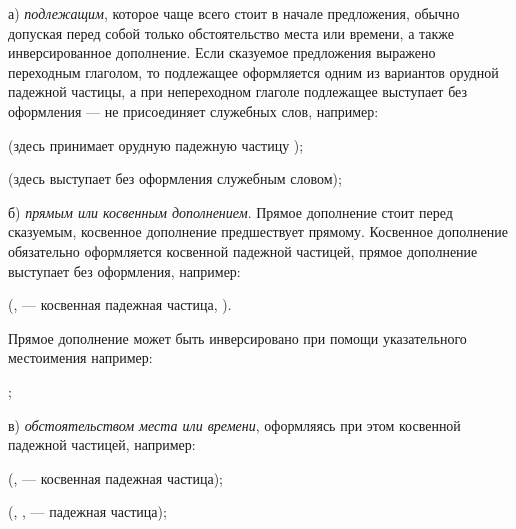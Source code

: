 а) \emph{подлежащим}, которое чаще всего стоит в начале предложения, обычно допуская перед собой только обстоятельство места или времени, а также инверсированное дополнение. Если сказуемое предложения выражено переходным глаголом, то подлежащее оформляется одним из вариантов орудной падежной частицы, а при непереходном глаголе подлежащее выступает без оформления --- не присоединяет служебных слов, например:
\begin{prfsample}
    \item {} (здесь  принимает орудную падежную частицу );
    \item {} (здесь  выступает без оформления служебным словом);
\end{prfsample}

б) \emph{прямым или косвенным дополнением}. Прямое дополнение стоит перед сказуемым, косвенное дополнение предшествует прямому. Косвенное дополнение обязательно оформляется косвенной падежной частицей, прямое дополнение выступает без оформления, например:
\begin{prfsample}
    \item {} (,  --- косвенная падежная частица, ).
\end{prfsample}
Прямое дополнение может быть инверсировано при помощи указательного местоимения  например:
\begin{prfsample}
    \item {};
\end{prfsample}

в) \emph{обстоятельством места или времени}, оформляясь при этом косвенной падежной частицей, например:
\begin{prfsample}
    \item {} (,  --- косвенная падежная частица);
    \item {}
    (, ,  --- падежная частица);
\end{prfsample}

